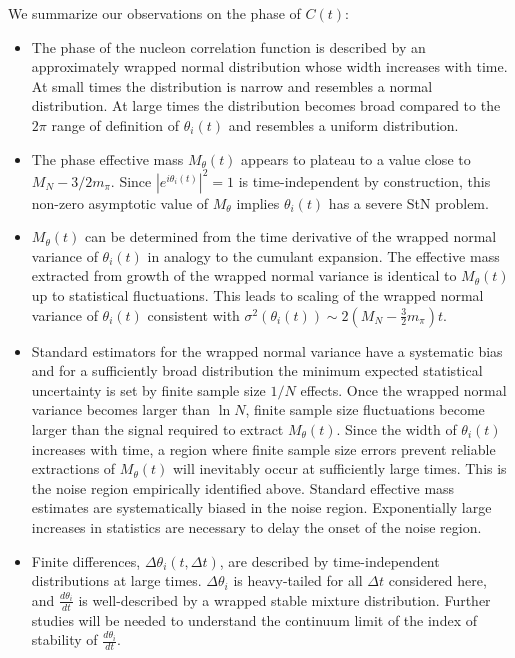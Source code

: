 We summarize our observations on the  phase of $C(t)$:
\begin{itemize}
  \item 
  The  phase of the nucleon correlation function is described by an approximately wrapped normal distribution 
  whose width increases with time. At small times the distribution is narrow and resembles a normal distribution. 
  At large times the distribution becomes broad compared to the $2\pi$ range of definition of $\theta_i(t)$ and resembles a uniform distribution. 
  \item 
  The phase effective mass $M_\theta(t)$ appears to plateau to a value close to $M_N - 3/2 m_\pi$. 
  Since $|e^{i\theta_i(t)}|^2 = 1$ is time-independent by construction, this non-zero asymptotic value of 
  $M_\theta$ implies $\theta_i(t)$ has a severe StN problem.
  \item 
  $M_\theta(t)$ can be determined from the time derivative of the wrapped normal variance of $\theta_i(t)$ 
  in analogy to the cumulant expansion. The effective mass extracted from growth of the wrapped 
  normal variance is identical to $M_\theta(t)$ up to statistical fluctuations. 
  This leads to scaling of the wrapped normal variance of $\theta_i(t)$ consistent with 
  $\sigma^2(\theta_i(t)) \sim 2(M_N - \frac{3}{2}m_\pi)t$.
  \item 
  Standard estimators for the wrapped normal variance have a systematic bias and for a sufficiently broad distribution the 
  minimum expected statistical uncertainty is set by finite sample size $1/N$ effects. 
  Once the wrapped normal variance becomes larger than $\ln N$, finite sample size fluctuations 
  become larger than the signal required to extract $M_\theta(t)$. 
  Since the width of $\theta_i(t)$ increases with time, a region where finite sample size errors prevent reliable extractions of $M_\theta(t)$ will inevitably occur at sufficiently large times. This is the noise region empirically identified above. Standard effective mass estimates are systematically biased in the noise region. Exponentially large increases in statistics are necessary to delay the onset of the noise region. 
  \item 
  Finite differences, $\Delta \theta_i(t,\Delta t)$, are described by time-independent distributions at large times. 
  $\Delta \theta_i$ is heavy-tailed for all $\Delta t$ considered here, and  $\frac{d\theta_i}{dt}$ 
  is well-described by a wrapped stable mixture distribution. 
  Further studies will be needed to understand the continuum limit of the  index of stability of $\frac{d\theta_i}{dt}$. 
\end{itemize}




